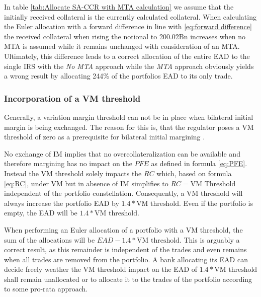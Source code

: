 \documentclass[../Thesis_AHoecherl.tex]{subfiles}
\begin{document}
    In table \ref{tab:Allocate SA-CCR with MTA calculation} we assume that the initially received collateral is the currently calculated collateral. 
    When calculating the Euler allocation with a forward difference in line with \ref{eq:forward difference} the received collateral when rising the notional to 200.02Bn increases when no MTA is assumed while it remains unchanged with consideration of an MTA. 
    Ultimately, this difference leads to a correct allocation of the entire EAD to the single IRS with the \emph{No MTA} approach while the \emph{MTA} approach obviously yields a wrong result by allocating 244\% of the portfolios EAD to its only trade.

    
    \subsubsection{Incorporation of a VM threshold\label{sec:Incorporation of a VM threshold}}
    
    Generally, a variation margin threshold can not be in place when bilateral initial margin is being exchanged. The reason for this is, that the regulator poses a VM threshold of zero as a prerequisite for bilateral initial margining \cite[Requirement 2.1]{BCBS_MarginRequirements}.

    No exchange of IM implies that no overcollateralization can be available and therefore margining has no impact on the $PFE$ as defined in formula \ref{eq:PFE}. Instead the VM threshold solely impacts the $RC$ which, based on formula \ref{eq:RC}, under VM but in absence of IM simplifies to $RC = \text{VM Threshold}$ independent of the portfolio constellation. 
    Consequently, a VM threshold will always increase the portfolio EAD by $1.4*\text{VM threshold}$. Even if the portfolio is empty, the EAD will be $1.4 * \text{VM threshold}$.

    When performing an Euler allocation of a portfolio with a VM threshold, the sum of the allocations will be $EAD - 1.4 * \text{VM threshold}$. This is arguably a correct result, as this remainder is independent of the trades and even remains when all trades are removed from the portfolio. 
    A bank allocating its EAD can decide freely weather the VM threshold impact on the EAD of $1.4 * \text{VM threshold}$ shall remain unallocated or to allocate it to the trades of the portfolio according to some pro-rata approach.
\end{document}
